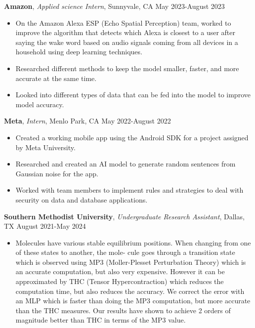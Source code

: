 \documentclass[a4paper,10pt]{article}
\begin{document}
\noindent\textbf{Amazon}, \textit{Applied science Intern}, Sunnyvale, CA \hfill May 2023-August 2023
\begin{itemize}[noitemsep,topsep=0pt]
  \item On the Amazon Alexa ESP (Echo Spatial Perception) team, worked to improve the algorithm that detects which Alexa is closest to a user after saying the wake word based on audio signals coming from all devices in a household using deep learning techniques.
  \item Researched different methods to keep the model smaller, faster, and more accurate at the same time.
  \item Looked into different types of data that can be fed into the model to improve model accuracy.
\end{itemize}

\noindent\textbf{Meta}, \textit{Intern}, Menlo Park, CA \hfill May 2022-August 2022
\begin{itemize}[noitemsep,topsep=0pt]
  \item Created a working mobile app using the Android SDK for a project assigned by Meta University.
  \item Researched and created an AI model to generate random sentences from Gaussian noise for the app.
  \item Worked with team members to implement rules and strategies to deal with security on data and database applications.
\end{itemize}

\noindent\textbf{Southern Methodist University}, \textit{Undergraduate Research Assistant}, Dallas, TX \hfill August 2021-May 2024
\begin{itemize}[noitemsep,topsep=0pt]
  \item Molecules have various stable equilibrium positions. When changing from one of these states to another, the mole- cule goes through a transition state which is observed using MP3 (Moller-Plesset Perturbation Theory) which is an accurate computation, but also very expensive. However it can be approximated by THC (Tensor Hypercontraction) which reduces the computation time, but also reduces the accuracy. We correct the error with an MLP which is faster than doing the MP3 computation, but more accurate than the THC measures. Our results have shown to achieve 2 orders of magnitude better than THC in terms of the MP3 value.
\end{itemize}


\newpage
\end{document}
